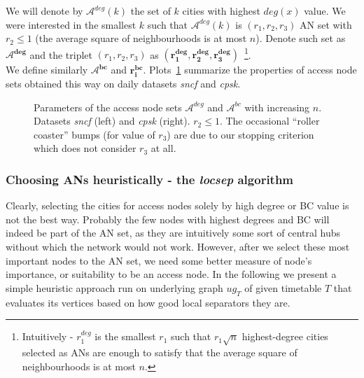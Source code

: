 		\noindent We will denote by $\mathcal{A}^{deg}(k)$ the set of $k$ cities with highest $deg(x)$ value. We were interested in the smallest $k$ such that $\mathcal{A}^{deg}(k)$ is $(r_{1}, r_{2}, r_{3})$ AN set with $r_{2} \leq 1$ (the average square of neighbourhoods is at most $n$). Denote such set as $\bm{\mathcal{A}^{deg}}$ and the triplet $(r_{1}, r_{2}, r_{3})$ as $\bm{(r_{1}^{deg}, r_{2}^{deg}, r_{3}^{deg})}$~\footnote{Intuitively - $r_{1}^{deg}$ is the smallest $r_{1}$ such that $r_{1}\sqrt{n}$ highest-degree cities selected as ANs are enough to satisfy that the average square of neighbourhoods is at most $n$.}. \\
		
		\noindent We define similarly $\bm{\mathcal{A}^{bc}}$ and $\bm{r_{i}^{bc}}$. Plots~\ref{plot:hbcdeg-size} summarize the properties of access node sets obtained this way on daily datasets \textit{sncf} and \textit{cpsk}.
		
		\begin{figure}[htb]
		\centering
	    \caption{\label{plot:hbcdeg-size} Parameters of the access node sets $\mathcal{A}^{deg}$ and $\mathcal{A}^{bc}$ with increasing $n$. Datasets \textit{sncf} (left) and \textit{cpsk} (right). $r_{2} \leq 1$. The occasional ``roller coaster'' bumps (for value of $r_{3}$) are due to our stopping criterion which does not consider $r_{3}$ at all.}
		\end{figure}
		
	\subsubsection{Choosing ANs heuristically - the \textit{locsep} algorithm}
	
		Clearly, selecting the cities for access nodes solely by high degree or BC value is not the best way. Probably the few nodes with highest degrees and BC will indeed be part of the AN set, as they are intuitively some sort of central hubs without which the network would not work. However, after we select these most important nodes to the AN set, we need some better measure of node's importance, or suitability to be an access node. In the following we present a simple heuristic approach run on underlying graph $ug_{T}$ of given timetable $T$ that evaluates its vertices based on how good local separators they are. 
		
